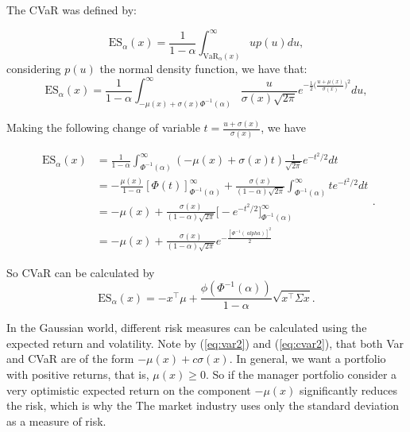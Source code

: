 The CVaR was defined by:

\[
\mbox{ES}_\alpha(x) = \frac{1}{1-\alpha}\int_{\mbox{VaR}_\alpha(x)}^\infty u p(u)du,
\] considering $p(u)$ the normal density function, we have that:
\[
\mbox{ES}_\alpha(x) = \frac{1}{1-\alpha}\int_{-\mu(x)+ \sigma(x)\Phi^{-1}(\alpha)} ^\infty \frac{u}{\sigma(x)\sqrt{2\pi}} e^{-\frac{1}{2}\Big(\frac{u+\mu(x)}{\sigma (x)}\Big)^2} du,
\]

Making the following change of variable
$t=\frac{u+\sigma(x)}{\sigma(x)}$, we have

\[
\begin{aligned}
\mbox{ES}_\alpha(x) & = \frac{1}{1-\alpha}\int_{\Phi^{-1}(\alpha)}^\infty (-\mu(x)+ \sigma(x)t) \frac{1}{\sqrt{2\pi}} e^{-t^2/2}dt \\
& = -\frac{\mu(x)}{1-\alpha}[\Phi(t)]_{\Phi^{-1}(\alpha)}^\infty +
\frac{\sigma(x)}{(1-\alpha)\sqrt{2\pi}}\int_{\Phi^{-1}(\alpha)}^\infty t e^{-t^2/ 2}dt \\
& =-\mu(x) + \frac{\sigma(x)}{(1-\alpha)\sqrt{2\pi}}\Big[-e^{-t^2/2} \Big] _{\Phi^{-1}(\alpha)}^\infty \\
& = -\mu(x) + \frac{\sigma(x)}{(1-\alpha)\sqrt{2\pi}}e^{-\frac{[\Phi^{-1}(\ alpha)]^2}{2}}
\end{aligned}.
\]

So CVaR can be calculated by \begin{equation}\label{eq:cvar2}
\mbox{ES}_\alpha(x)=-x^\top \mu + \frac{\phi(\Phi^{-1}(\alpha))}{1-\alpha}\sqrt{x^ \top \Sigma x}.
\end{equation}

In the Gaussian world, different risk measures can be calculated
using the expected return and volatility. Note by (\ref{eq:var2}) and
(\ref{eq:cvar2}), that both Var and CVaR are of the form
$-\mu(x)+c\sigma(x)$. In general, we want a portfolio with
positive returns, that is, $\mu(x)\geq0$. So if the manager
portfolio consider a very optimistic expected return on the component
$-\mu(x)$ significantly reduces the risk, which is why the
The market industry uses only the standard deviation as a measure of
risk.

